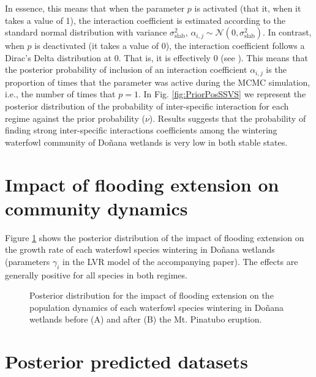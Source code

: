 \documentclass[11pt]{article}
\begin{document}
In essence, this means that when the parameter $p$ is activated (that it, when it takes a value of 1), the interaction coefficient is estimated according to the standard normal distribution with variance $\sigma^2_{\text{slab}}$, $\alpha_{i,j} \sim \mathcal{N} \left(0, \sigma^2_{\text{slab}} \right)$. In contrast, when $p$ is deactivated (it takes a value of 0), the interaction coefficient follows a Dirac's Delta distribution at 0. That is, it is effectively 0 (see \cite{Ishwaran2005}). This means that the posterior probability of inclusion of an interaction coefficient $\alpha_{i,j}$ is the proportion of times that the parameter was active during the MCMC simulation, i.e., the number of times that $p = 1$. In Fig. \ref{fig:PriorPosSSVS} we represent the posterior distribution of the probability of inter-specific interaction for each regime against the prior probability ($\nu$). Results suggests that the probability of finding strong inter-specific interactions coefficients among the wintering waterfowl community of Doñana wetlands is very low in both stable states.\\

\section{Impact of flooding extension on community dynamics}

Figure \ref{fig:FloodingImpact} shows the posterior distribution of the impact of flooding extension on the growth rate of each waterfowl species wintering in Doñana wetlands (parameters $\gamma_{i}$ in the LVR model of the accompanying paper). The effects are generally positive for all species in both regimes.\\

\renewcommand{\thefigure}{S2}
\begin{figure}[t]
	\centering
	\qquad
	\caption{Posterior distribution for the impact of flooding extension on the population dynamics of each waterfowl species wintering in Doñana wetlands before (A) and after (B) the Mt. Pinatubo eruption.}%
	\label{fig:FloodingImpact}%
\end{figure}

\section{Posterior predicted datasets}
\end{document}

